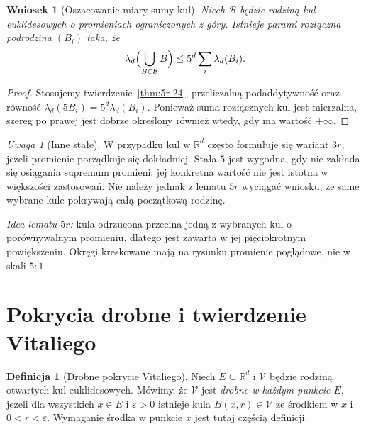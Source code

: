 \documentclass[11pt,a4paper,oneside]{book}
\numberwithin{equation}{chapter}
\theoremstyle{plain}
\newtheorem{wniosek}[twierdzenie]{Wniosek}
\theoremstyle{definition}
\newtheorem{definicja}[twierdzenie]{Definicja}
\theoremstyle{remark}
\newtheorem{uwaga}[twierdzenie]{Uwaga}
\begin{document}
\begin{wniosek}[Oszacowanie miary sumy kul]
\label{cor:5r-volume-24}
Niech $\mathcal B$ będzie rodziną kul euklidesowych o promieniach
ograniczonych z góry. Istnieje parami rozłączna podrodzina
$(B_i)$ taka, że
\[
 \lambda_d\Bigl(\bigcup_{B\in\mathcal B}B\Bigr)
 \le 5^d\sum_i\lambda_d(B_i).
\]
\end{wniosek}
\begin{proof}
Stosujemy twierdzenie~\ref{thm:5r-24}, przeliczalną
podaddytywność oraz równość $\lambda_d(5B_i)=5^d\lambda_d(B_i)$.
Ponieważ suma rozłącznych kul jest mierzalna, szereg po prawej
jest dobrze określony również wtedy, gdy ma wartość $+\infty$.
\end{proof}

\begin{uwaga}[Inne stałe]
W przypadku kul w $\mathbb R^d$ często formułuje się wariant
$3r$, jeżeli promienie porządkuje się dokładniej. Stała $5$
jest wygodna, gdy nie zakłada się osiągania supremum promieni;
jej konkretna wartość nie jest istotna w większości zastosowań.
Nie należy jednak z lematu $5r$ wyciągać wniosku, że same
wybrane kule pokrywają całą początkową rodzinę.
\end{uwaga}

\begin{center}
\end{center}
\noindent\textit{Idea lematu $5r$:} kula odrzucona przecina jedną
z wybranych kul o porównywalnym promieniu, dlatego jest
zawarta w jej pięciokrotnym powiększeniu. Okręgi
kreskowane mają na rysunku promienie poglądowe, nie
w skali $5{:}1$.

\section{Pokrycia drobne i twierdzenie Vitaliego}
\begin{definicja}[Drobne pokrycie Vitaliego]
\label{def:vitali-fine-24}
Niech $E\subseteq\mathbb R^d$ i $\mathcal V$ będzie rodziną
otwartych kul euklidesowych. Mówimy, że $\mathcal V$ jest
\emph{drobne w każdym punkcie $E$}, jeżeli dla wszystkich
$x\in E$ i $\varepsilon>0$ istnieje kula
$B(x,r)\in\mathcal V$ ze środkiem w $x$ i $0<r<\varepsilon$.
Wymaganie środka w punkcie $x$ jest tutaj częścią definicji.
\end{definicja}
\end{document}

